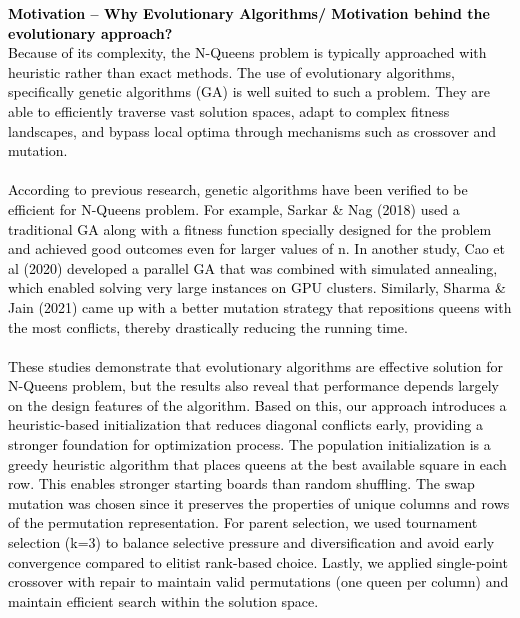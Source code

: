 \documentclass{scrartcl}
\begin{document}
\textcolor{black}{\textbf{Motivation – Why Evolutionary Algorithms/ Motivation behind the evolutionary approach?\\} Because of its complexity, the N-Queens problem is typically approached with heuristic rather than exact methods. The use of evolutionary algorithms, specifically genetic algorithms (GA) is well suited to such a problem. They are able to efficiently traverse vast solution spaces, adapt to complex fitness landscapes, and bypass local optima through mechanisms such as crossover and mutation. \\ \\ According to previous research, genetic algorithms have been verified to be efficient for N-Queens problem. For example, Sarkar & Nag (2018) used a traditional GA along with a fitness function specially designed for the problem and achieved good outcomes even for larger values of n. In another study, Cao et al (2020) developed a parallel GA that was combined with simulated annealing, which enabled solving very large instances on GPU clusters. Similarly, Sharma & Jain (2021) came up with a better mutation strategy that repositions queens with the most conflicts, thereby drastically reducing the running time. \\ \\ These studies demonstrate that evolutionary algorithms are effective solution for N-Queens problem, but the results also reveal that performance depends largely on the design features of the algorithm. Based on this, our approach introduces a heuristic-based initialization that reduces diagonal conflicts early, providing a stronger foundation for optimization process. The population initialization is a greedy heuristic algorithm that places queens at the best available square in each row. This enables stronger starting boards than random shuffling. The swap mutation was chosen since it preserves the properties of unique columns and rows of the permutation representation. For parent selection, we used tournament selection (k=3) to balance selective pressure and diversification and avoid early convergence compared to elitist rank-based choice. Lastly, we applied single-point crossover with repair to maintain valid permutations (one queen per column) and maintain efficient search within the solution space. }
\end{document}

